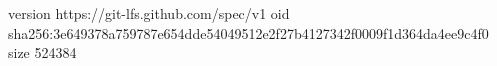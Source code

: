 version https://git-lfs.github.com/spec/v1
oid sha256:3e649378a759787e654dde54049512e2f27b4127342f0009f1d364da4ee9c4f0
size 524384
